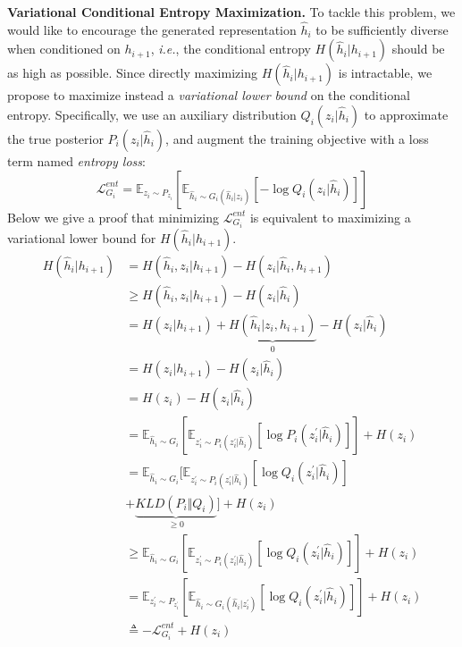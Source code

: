 \documentclass[10pt,twocolumn,letterpaper]{article}
\newcommand{\vpara}[1]{\vspace{0.1in}\noindent\textbf{#1}}
\begin{document}
\vpara{Variational Conditional Entropy Maximization.} To tackle this problem, we would like to encourage the generated representation $\hat{h}_{i}$ to be sufficiently diverse when conditioned on $h_{i+1}$, \emph{i.e.}, the conditional entropy $H(\hat{h}_{i}|h_{i+1})$ should be as high as possible. Since directly maximizing $H(\hat{h}_{i}|h_{i+1})$ is  intractable, we propose to maximize instead a \emph{variational lower bound} on the conditional entropy. Specifically, we use an auxiliary distribution $Q_{i}(z_{i}|\hat{h}_{i})$ to approximate the true posterior $P_{i}(z_{i}|\hat{h}_{i})$, and augment the training objective with a loss term named \emph{entropy loss}: 
\begin{equation}
\mathcal{L}_{G_{i}}^{ent} = \mathbb{E}_{z_{i}\sim P_{z_{i}}}[\mathbb{E}_{\hat{h}_{i}\sim G_{i}(\hat{h}_{i}|z_{i})} [-\log Q_{i}(z_{i}|\hat{h}_{i})]]
\end{equation}
Below we give a proof that minimizing $\mathcal{L}_{G_{i}}^{ent}$ is equivalent to maximizing a variational lower bound for $H(\hat{h}_{i}|h_{i+1})$. 
\begin{equation}
\begin{split}
H(\hat{h}_{i}|h_{i+1}) &= H(\hat{h}_{i}, z_{i}|h_{i+1}) - H(z_{i}|\hat{h}_{i}, h_{i+1}) \\
					   &\geq  H(\hat{h}_{i}, z_{i}|h_{i+1}) - H(z_{i}|\hat{h}_{i}) \\
					   &=  H(z_{i}|h_{i+1}) + \underbrace{H(\hat{h}_{i}|z_{i},h_{i+1})}_{0}- H(z_{i}|\hat{h}_{i}) \\
					   &=  H(z_{i}|h_{i+1}) - H(z_{i}|\hat{h}_{i}) \\
					   &=  H(z_{i}) - H(z_{i}|\hat{h}_{i}) \\
        			   &=  \mathbb{E}_{\hat{h}_{i}\sim G_{i}}[\mathbb{E}_{z_{i}^{\prime}\sim P_{i}(z_{i}^{\prime}|\hat{h}_{i})} [\log P_{i}(z_{i}^{\prime}|\hat{h}_{i})]] + H(z_{i}) 	\\
       			 	   &=  \mathbb{E}_{\hat{h}_{i}\sim G_{i}}[\mathbb{E}_{z_{i}^{\prime}\sim P_{i}(z_{i}^{\prime}|\hat{h}_{i})} [\log Q_{i}(z_{i}^{\prime}|\hat{h}_{i})] \\
       			 	   &+\underbrace{KLD(P_{i} \Vert Q_{i})}_{\geq 0}] + H(z_{i}) \\
       			 	   &\geq  \mathbb{E}_{\hat{h}_{i}\sim G_{i}}[\mathbb{E}_{z_{i}^{\prime}\sim P_{i}(z_{i}^{\prime}|\hat{h}_{i})} [\log Q_{i}(z_{i}^{\prime}|\hat{h}_{i})]] + H(z_{i}) \\
       			 	   &=  \mathbb{E}_{z_{i}^{\prime}\sim P_{z_{i}^{\prime}}}[\mathbb{E}_{\hat{h}_{i}\sim G_{i}(\hat{h}_{i}|z_{i}^{\prime})} [\log Q_{i}(z_{i}^{\prime}|\hat{h}_{i})]] + H(z_{i}) \\
       			 	   &\triangleq -\mathcal{L}_{G_{i}}^{ent} + H(z_{i})
\end{split}
\end{equation}
\end{document}

